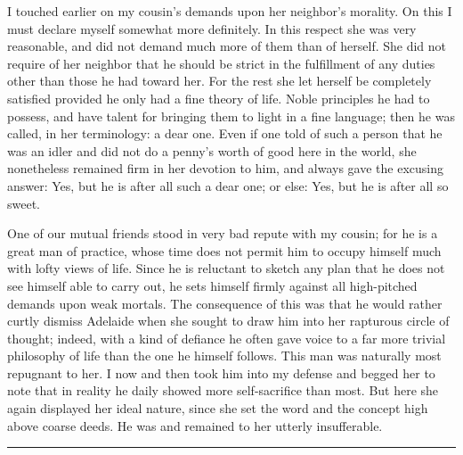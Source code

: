\documentclass[12pt]{article}
\newcommand{\opage}[1]{\marginnote{\footnotesize\textit{[#1]}}}
\newcommand{\qvbreak}{\par\medskip\begin{center}\rule{0.32\textwidth}{0.4pt}\end{center}\medskip}
\begin{document}
I touched earlier on my cousin's demands upon her neighbor's morality. On this I
must declare myself somewhat more definitely. In this respect she was very
reasonable, and did not demand much more of them than of herself. She did not
require of her neighbor that he \opage{8}should be strict in the fulfillment of
any duties other than those he had toward her. For the rest she let herself be
completely satisfied provided he only had a fine theory of life. Noble principles
he had to possess, and have talent for bringing them to light in a fine language;
then he was called, in her terminology: a dear one. Even if one told of such a
person that he was an idler and did not do a penny's worth of good here in the
world, she nonetheless remained firm in her devotion to him, and always gave the
excusing answer: Yes, but he is after all such a dear one; or else: Yes, but he is
after all so sweet.

One of our mutual friends stood in very bad repute with my cousin; for he is a
great man of practice, whose time does not permit him to occupy himself much with
lofty views of life. Since he is reluctant to sketch any plan that he does not see
himself able to carry out, he sets himself firmly against all high-pitched demands
upon weak mortals. The consequence of this was that he would rather curtly dismiss
Adelaide when she sought to draw him into her rapturous circle of thought; indeed,
with a kind of defiance he often gave voice to a far more trivial philosophy of
life than the one he himself follows. This man was naturally most repugnant to
her. I now and then took him into my defense and begged her to note that in
reality he daily showed more self-sacrifice than most. But here she again
displayed her ideal nature, since she set the word and the concept high above
coarse deeds. He was and remained to her utterly insufferable.

\qvbreak
\end{document}
